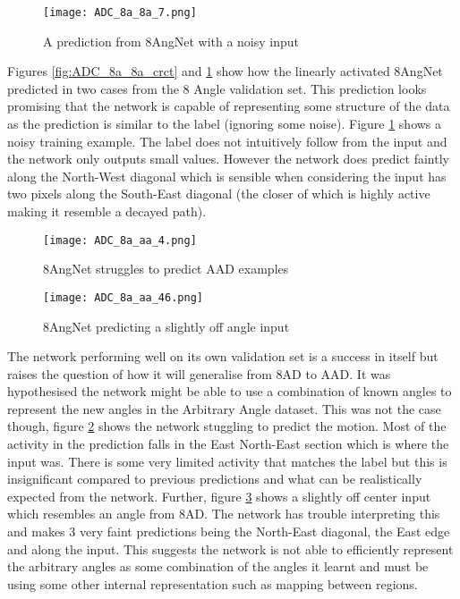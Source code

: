 \begin{figure}
    \centering
    \texttt{[image: ADC\_8a\_8a\_7.png]}
    \caption{A prediction from 8AngNet with a noisy input}
    \label{fig:ADC_8a_8a_noisy}
\end{figure}

Figures \ref{fig:ADC_8a_8a_crct} and \ref{fig:ADC_8a_8a_noisy} show how the linearly activated 8AngNet predicted in two cases from the 8 Angle validation set.
This prediction looks promising that the network is capable of representing some structure of the data as the prediction is similar to the label (ignoring some noise).
Figure \ref{fig:ADC_8a_8a_noisy} shows a noisy training example.
The label does not intuitively follow from the input and the network only outputs small values.
However the network does predict faintly along the North-West diagonal which is sensible when considering the input has two pixels along the South-East diagonal (the closer of which is highly active making it resemble a decayed path). 

\begin{figure}
    \centering
    \texttt{[image: ADC\_8a\_aa\_4.png]}
    \caption{8AngNet struggles to predict AAD examples}
    \label{fig:ADC_8aNoaa}
\end{figure}

\begin{figure}
    \centering
    \texttt{[image: ADC\_8a\_aa\_46.png]}
    \caption{8AngNet predicting a slightly off angle input}
    \label{fig:ADC_8aNoaa_fork}
\end{figure}

The network performing well on its own validation set is a success in itself but raises the question of how it will generalise from 8AD to AAD.
It was hypothesised the network might be able to use a combination of known angles to represent the new angles in the Arbitrary Angle dataset.
This was not the case though, figure \ref{fig:ADC_8aNoaa} shows the network stuggling to predict the motion.
Most of the activity in the prediction falls in the East North-East section which is where the input was.
There is some very limited activity that matches the label but this is insignificant compared to previous predictions and what can be realistically expected from the network. 
Further, figure \ref{fig:ADC_8aNoaa_fork} shows a slightly off center input which resembles an angle from 8AD. 
The network has trouble interpreting this and makes 3 very faint predictions being the North-East diagonal, the East edge and along the input.
This suggests the network is not able to efficiently represent the arbitrary angles as some combination of the angles it learnt and must be using some other internal representation such as mapping between regions.

